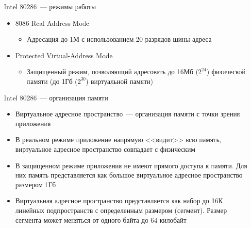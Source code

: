 \documentclass[aspectratio=169,14pt]{beamer}
\begin{document}
\begin{frame}{Intel 80286~--- режимы работы}
    \begin{itemize}
        \item 8086 Real-Address Mode
        \begin{itemize}
            \item Адресация до 1М с использованием 20 разрядов шины адреса
        \end{itemize}
        \item Protected Virtual-Address Mode
        \begin{itemize}
            \item Защищенный режим, позволяющий адресовать до 16Мб
             ($2^{24}$) физической памяти (до 1Гб ($2^{30}$) виртуальной памяти)
        \end{itemize}
    \end{itemize}
\end{frame}

\begin{frame}{Intel 80286~--- организация памяти}
    \begin{itemize}
        \item Виртуальное адресное пространство~--- организация памяти с точки
        зрения приложения
        \item В реальном режиме приложение напрямую <<видит>> всю память,
        виртуальное адресное пространство совпадает с физическим
        \item В защищенном режиме приложения не имеют прямого доступа к памяти.
        Для них память представляется как большое виртуальное адресное
        пространство размером 1Гб
        \item Виртуальная адресное пространство представляется как набор
        до 16К линейных подпространств с определенным размером (сегмент).
        Размер сегмента может меняться от одного байта до 64 килобайт
    \end{itemize}
\end{frame}
\end{document}
